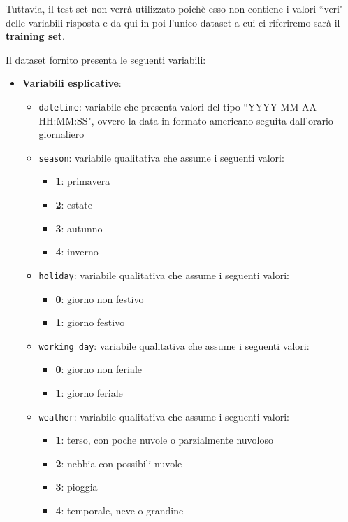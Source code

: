 Tuttavia, il test set non verrà utilizzato poichè esso non contiene i valori
``veri" delle variabili risposta e da qui in poi l'unico dataset a cui ci
riferiremo sarà il \textbf{training set}.

Il dataset fornito presenta le seguenti variabili:

\begin{itemize}
\item \textbf{Variabili esplicative}:
  \begin{itemize}
  \item \texttt{datetime}: variabile che presenta valori del tipo ``YYYY-MM-AA
    HH:MM:SS", ovvero la data in formato americano seguita dall'orario
    giornaliero

  \item \texttt{season}: variabile qualitativa che assume i seguenti valori:
    \begin{itemize}
    \item \textbf{1}: primavera
    \item \textbf{2}: estate
    \item \textbf{3}: autunno
    \item \textbf{4}: inverno
    \end{itemize}

  \item \texttt{holiday}: variabile qualitativa che assume i seguenti valori:
    \begin{itemize}
    \item \textbf{0}: giorno non festivo
    \item \textbf{1}: giorno festivo
    \end{itemize}

  \item \texttt{working day}: variabile qualitativa che assume i seguenti
    valori:
    \begin{itemize}
    \item \textbf{0}: giorno non feriale
    \item \textbf{1}: giorno feriale
    \end{itemize}

  \item \texttt{weather}: variabile qualitativa che assume i seguenti
    valori:
    \begin{itemize}
    \item \textbf{1}: terso, con poche nuvole o parzialmente nuvoloso
    \item \textbf{2}: nebbia con possibili nuvole
    \item \textbf{3}: pioggia
    \item \textbf{4}: temporale, neve o grandine
    \end{itemize}


\end{itemize}
\end{itemize}

